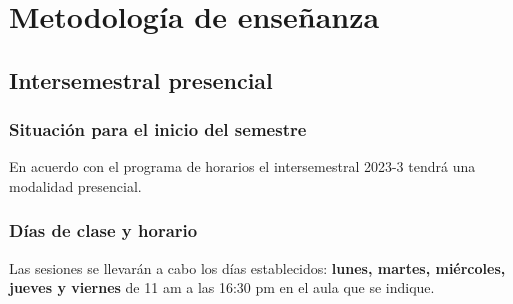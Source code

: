 \documentclass[12pt]{beamer}
\begin{document}
\section{Metodología de enseñanza}
\subsection{Intersemestral presencial}

\begin{frame}
\frametitle{Situación para el inicio del semestre}
En acuerdo con el programa de horarios el intersemestral 2023-3 tendrá una modalidad presencial.
\end{frame}
\begin{frame}
\frametitle{Días de clase y horario}
Las sesiones se llevarán a cabo los días establecidos: \textbf{lunes, martes, miércoles, jueves y viernes} de 11 am a las 16:30 pm en el aula que se indique.
\end{frame}
\end{document}
